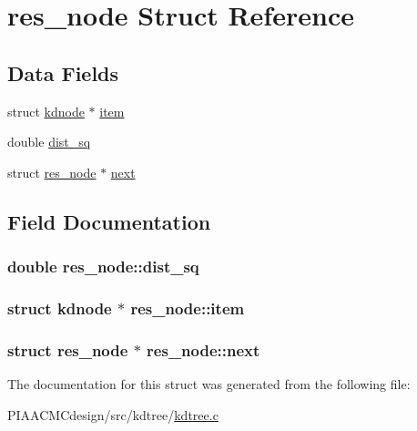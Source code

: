 \hypertarget{structres__node}{\section{res\+\_\+node Struct Reference}
\label{structres__node}
}
\subsection*{Data Fields}
\begin{DoxyCompactItemize}
\item 
struct \hyperlink{structkdnode}{kdnode} $\ast$ \hyperlink{structres__node_aa83ed4e4893f1e35bd63633269d5e57f}{item}
\item 
double \hyperlink{structres__node_ac291090c8cb9b8ec553c1eeee9c64882}{dist\+\_\+sq}
\item 
struct \hyperlink{structres__node}{res\+\_\+node} $\ast$ \hyperlink{structres__node_ad39134ef60c49beaf713898e3bb5c3b7}{next}
\end{DoxyCompactItemize}


\subsection{Field Documentation}
\hypertarget{structres__node_ac291090c8cb9b8ec553c1eeee9c64882}{
\subsubsection[{dist\+\_\+sq}]{\setlength{\rightskip}{0pt plus 5cm}double res\+\_\+node\+::dist\+\_\+sq}}\label{structres__node_ac291090c8cb9b8ec553c1eeee9c64882}
\hypertarget{structres__node_aa83ed4e4893f1e35bd63633269d5e57f}{
\subsubsection[{item}]{\setlength{\rightskip}{0pt plus 5cm}struct {\bf kdnode} $\ast$ res\+\_\+node\+::item}}\label{structres__node_aa83ed4e4893f1e35bd63633269d5e57f}
\hypertarget{structres__node_ad39134ef60c49beaf713898e3bb5c3b7}{
\subsubsection[{next}]{\setlength{\rightskip}{0pt plus 5cm}struct {\bf res\+\_\+node} $\ast$ res\+\_\+node\+::next}}\label{structres__node_ad39134ef60c49beaf713898e3bb5c3b7}


The documentation for this struct was generated from the following file\+:\begin{DoxyCompactItemize}
\item 
P\+I\+A\+A\+C\+M\+Cdesign/src/kdtree/\hyperlink{PIAACMCdesign_2src_2kdtree_2kdtree_8c}{kdtree.\+c}\end{DoxyCompactItemize}
